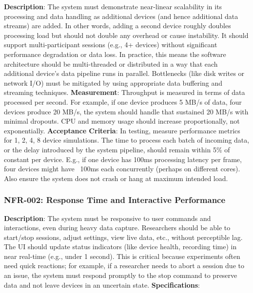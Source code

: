 \documentclass[11pt,a4paper]{report}
\begin{document}
\textbf{Description}: The system must demonstrate near-linear scalability in its processing and data handling as additional devices (and hence additional data streams) are added. In other words, adding a second device roughly doubles processing load but should not double any overhead or cause instability. It should support multi-participant sessions (e.g., 4+ devices) without significant performance degradation or data loss. In practice, this means the software architecture should be multi-threaded or distributed in a way that each additional device’s data pipeline runs in parallel. Bottlenecks (like disk writes or network I/O) must be mitigated by using appropriate data buffering and streaming techniques. \textbf{Measurement}: Throughput is measured in terms of data processed per second. For example, if one device produces 5 MB/s of data, four devices produce 20 MB/s, the system should handle that sustained 20 MB/s with minimal dropouts. CPU and memory usage should increase proportionally, not exponentially. \textbf{Acceptance Criteria}: In testing, measure performance metrics for 1, 2, 4, 8 device simulations. The time to process each batch of incoming data, or the delay introduced by the system pipeline, should remain within 5\% of constant per device. E.g., if one device has 100ms processing latency per frame, four devices might have ~100ms each concurrently (perhaps on different cores). Also ensure the system does not crash or hang at maximum intended load. \subsubsection*{NFR-002: Response Time and Interactive Performance}
\textbf{Description}: The system must be responsive to user commands and interactions, even during heavy data capture. Researchers should be able to start/stop sessions, adjust settings, view live data, etc., without perceptible lag. The UI should update status indicators (like device health, recording time) in near real-time (e.g., under 1 second). This is critical because experiments often need quick reactions; for example, if a researcher needs to abort a session due to an issue, the system must respond promptly to the stop command to preserve data and not leave devices in an uncertain state. \textbf{Specifications}:
\end{document}
